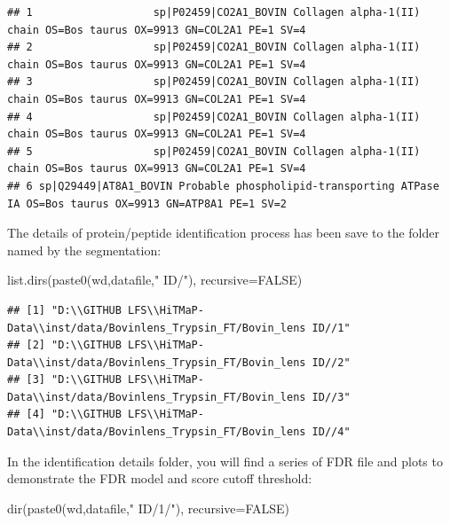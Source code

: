 \documentclass[
]{article}
\newenvironment{Shaded}{\begin{snugshade}}{\end{snugshade}}
\newcommand{\AttributeTok}[1]{\textcolor[rgb]{0.77,0.63,0.00}{#1}}
\newcommand{\ConstantTok}[1]{\textcolor[rgb]{0.00,0.00,0.00}{#1}}
\newcommand{\FunctionTok}[1]{\textcolor[rgb]{0.00,0.00,0.00}{#1}}
\newcommand{\NormalTok}[1]{#1}
\newcommand{\StringTok}[1]{\textcolor[rgb]{0.31,0.60,0.02}{#1}}
\begin{document}
\begin{verbatim}
## 1                   sp|P02459|CO2A1_BOVIN Collagen alpha-1(II) chain OS=Bos taurus OX=9913 GN=COL2A1 PE=1 SV=4
## 2                   sp|P02459|CO2A1_BOVIN Collagen alpha-1(II) chain OS=Bos taurus OX=9913 GN=COL2A1 PE=1 SV=4
## 3                   sp|P02459|CO2A1_BOVIN Collagen alpha-1(II) chain OS=Bos taurus OX=9913 GN=COL2A1 PE=1 SV=4
## 4                   sp|P02459|CO2A1_BOVIN Collagen alpha-1(II) chain OS=Bos taurus OX=9913 GN=COL2A1 PE=1 SV=4
## 5                   sp|P02459|CO2A1_BOVIN Collagen alpha-1(II) chain OS=Bos taurus OX=9913 GN=COL2A1 PE=1 SV=4
## 6 sp|Q29449|AT8A1_BOVIN Probable phospholipid-transporting ATPase IA OS=Bos taurus OX=9913 GN=ATP8A1 PE=1 SV=2
\end{verbatim}

The details of protein/peptide identification process has been save to
the folder named by the segmentation:

\begin{Shaded}
\begin{Highlighting}[]
\FunctionTok{list.dirs}\NormalTok{(}\FunctionTok{paste0}\NormalTok{(wd,datafile,}\StringTok{" ID/"}\NormalTok{), }\AttributeTok{recursive=}\ConstantTok{FALSE}\NormalTok{)}
\end{Highlighting}
\end{Shaded}

\begin{verbatim}
## [1] "D:\\GITHUB LFS\\HiTMaP-Data\\inst/data/Bovinlens_Trypsin_FT/Bovin_lens ID//1"
## [2] "D:\\GITHUB LFS\\HiTMaP-Data\\inst/data/Bovinlens_Trypsin_FT/Bovin_lens ID//2"
## [3] "D:\\GITHUB LFS\\HiTMaP-Data\\inst/data/Bovinlens_Trypsin_FT/Bovin_lens ID//3"
## [4] "D:\\GITHUB LFS\\HiTMaP-Data\\inst/data/Bovinlens_Trypsin_FT/Bovin_lens ID//4"
\end{verbatim}

In the identification details folder, you will find a series of FDR file
and plots to demonstrate the FDR model and score cutoff threshold:

\begin{Shaded}
\begin{Highlighting}[]
\FunctionTok{dir}\NormalTok{(}\FunctionTok{paste0}\NormalTok{(wd,datafile,}\StringTok{" ID/1/"}\NormalTok{), }\AttributeTok{recursive=}\ConstantTok{FALSE}\NormalTok{)}
\end{Highlighting}
\end{Shaded}
\end{document}
